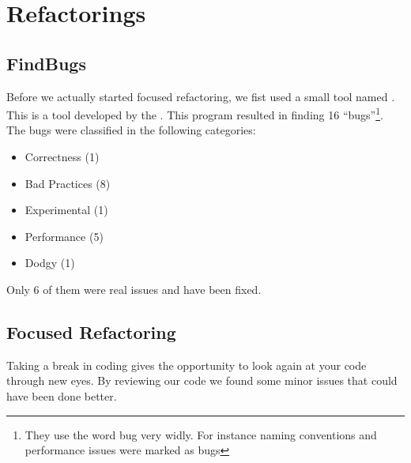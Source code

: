 \section{Refactorings}
\subsection{FindBugs}
Before we actually started focused refactoring, we fist used a small tool named . This is a tool developed by the . This program resulted in finding 16 ``bugs''\footnote{They use the word bug very widly. For instance naming conventions and performance issues were marked as bugs}. The bugs were classified in the following categories:
\begin{itemize}
 \item Correctness (1)
 \item Bad Practices (8)
 \item Experimental (1)
 \item Performance (5)
 \item Dodgy (1)
\end{itemize}
Only 6 of them were real issues and have been fixed.
\subsection{Focused Refactoring}
Taking a break in coding gives the opportunity to look again at your code through new eyes. By reviewing our code we found some minor issues that could have been done better.